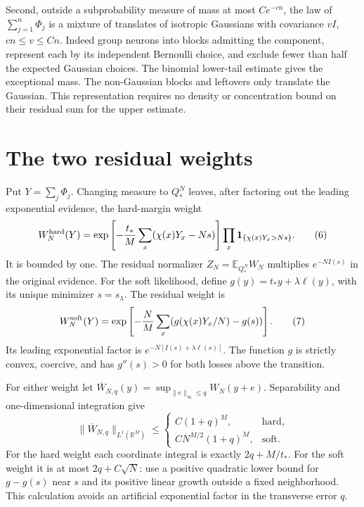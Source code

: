 \documentclass[11pt]{article}
\newcommand{\E}{\mathbb E}\newcommand{\Pp}{\mathbb P}
\newcommand{\R}{\mathbb R}\newcommand{\relu}{\operatorname{ReLU}}
\newcommand{\one}{\mathbf1}
\begin{document}
Second, outside a subprobability measure of mass at most $Ce^{-cn}$,
the law of $\sum_{j=1}^n\Phi_j$ is a mixture of translates of isotropic
Gaussians with covariance $vI$, $cn\le v\le Cn$. Indeed group neurons
into blocks admitting the component, represent each by its independent
Bernoulli choice, and exclude fewer than half the expected Gaussian
choices. The binomial lower-tail estimate gives the exceptional mass.
The non-Gaussian blocks and leftovers only translate the Gaussian.
This representation requires no density or concentration bound on their
residual sum for the upper estimate.

\section{The two residual weights}
Put $Y=\sum_j\Phi_j$. Changing measure to $Q_*^N$ leaves, after
factoring out the leading exponential evidence, the hard-margin weight
\[
 W_N^{\rm hard}(Y)=
 \exp\left[-\frac{t_*}{M}\sum_x(\chi(x)Y_x-Ns)\right]
 \prod_x\one_{\{\chi(x)Y_x>Ns\}}.                       \tag{6}
\]
It is bounded by one. The residual normalizer $Z_N=\E_{Q_*^N}W_N$
multiplies $e^{-NI(s)}$ in the original evidence.
For the soft likelihood, define
$g(y)=t_*y+\lambda\ell(y)$, with its unique minimizer $s=s_\lambda$.
The residual weight is
\[
 W_N^{\rm soft}(Y)=
 \exp\left[-\frac NM\sum_x(g(\chi(x)Y_x/N)-g(s))\right]. \tag{7}
\]
Its leading exponential factor is
$e^{-N[I(s)+\lambda\ell(s)]}$. The function $g$ is strictly convex,
coercive, and has $g''(s)>0$ for both losses above the transition.

For either weight let
$\overline W_{N,q}(y)=\sup_{\|e\|_\infty\le q}W_N(y+e)$.
Separability and one-dimensional integration give
\[
 \|\overline W_{N,q}\|_{L^1(\R^M)}\le
 \begin{cases}
 C(1+q)^M,&\text{hard},\\
 C N^{M/2}(1+q)^M,&\text{soft}.
 \end{cases}                                            \tag{8}
\]
For the hard weight each coordinate integral is exactly
$2q+M/t_*$. For the soft weight it is at most $2q+C\sqrt N$:
use a positive quadratic lower bound for $g-g(s)$ near $s$ and its
positive linear growth outside a fixed neighborhood. This calculation
avoids an artificial exponential factor in the transverse error $q$.
\end{document}
